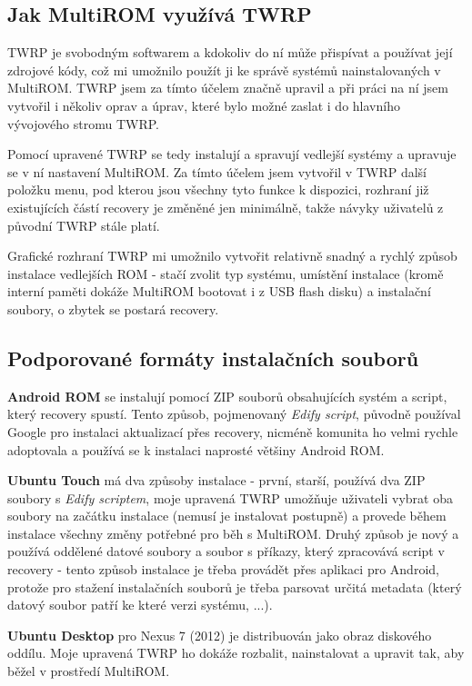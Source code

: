 \documentclass[12pt, a4paper, oneside]{article}
\newcommand{\B}{\textbf} %
\newcommand{\It}{\textit}  %
\begin{document}

\subsection{Jak MultiROM využívá TWRP}
TWRP je svobodným softwarem a kdokoliv do ní může přispívat a používat její zdrojové kódy, což mi umožnilo použít ji ke správě systémů nainstalovaných v MultiROM. TWRP jsem za tímto účelem značně upravil a při práci na ní jsem vytvořil i několiv oprav a úprav, které bylo možné zaslat i do hlavního vývojového stromu TWRP.

Pomocí upravené TWRP se tedy instalují a spravují vedlejší systémy a upravuje se v ní nastavení MultiROM. Za tímto účelem jsem vytvořil v TWRP další položku menu, pod kterou jsou všechny tyto funkce k dispozici, rozhraní již existujících částí recovery je změněné jen minimálně, takže návyky uživatelů z původní TWRP stále platí.

Grafické rozhraní TWRP mi umožnilo vytvořit relativně snadný a rychlý způsob instalace vedlejších ROM - stačí zvolit typ systému, umístění instalace (kromě interní paměti dokáže MultiROM bootovat i z USB flash disku) a instalační soubory, o zbytek se postará recovery.

\subsection {Podporované formáty instalačních souborů}
\B{Android ROM} se instalují pomocí ZIP souborů obsahujících systém a script, který recovery spustí. Tento způsob, pojmenovaný \It{Edify script}, původně používal Google pro instalaci aktualizací přes recovery, nicméně komunita ho velmi rychle adoptovala a používá se k instalaci naprosté většiny Android ROM.

\B{Ubuntu Touch} má dva způsoby instalace - první, starší, používá dva ZIP soubory s \It{Edify scriptem}, moje upravená TWRP umožňuje uživateli vybrat oba soubory na začátku instalace (nemusí je instalovat postupně) a provede během instalace všechny změny potřebné pro běh s MultiROM. Druhý způsob je nový a používá oddělené datové soubory a soubor s příkazy, který zpracovává script v recovery - tento způsob instalace je třeba provádět přes aplikaci pro Android, protože pro stažení instalačních souborů je třeba parsovat určitá metadata (který datový soubor patří ke které verzi systému, ...).

\B{Ubuntu Desktop} pro Nexus 7 (2012) je distribuován jako obraz diskového oddílu. Moje upravená TWRP ho dokáže rozbalit, nainstalovat a upravit tak, aby běžel v prostředí MultiROM. 
\end{document}
